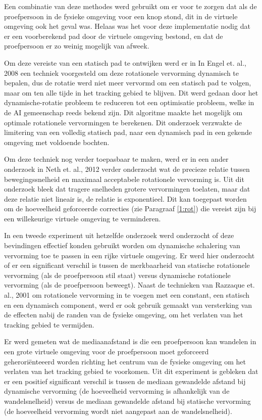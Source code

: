Een combinatie van deze methodes werd gebruikt om er voor te zorgen dat als de
proefpersoon in de fysieke omgeving voor een knop stond, dit in de virtuele
omgeving ook het geval was. Helaas was het voor deze implementatie nodig dat er
een voorberekend pad door de virtuele omgeving bestond, en dat de proefpersoon
er zo weinig mogelijk van afweek.

Om deze vereiste van een statisch pad te ontwijken werd er in In Engel et. al., 
2008 \cite{engel08} een techniek voorgesteld om deze rotationele vervorming 
dynamisch te bepalen, dus de rotatie werd niet meer vervormd om een statisch pad
te volgen, maar om ten alle tijde in het tracking gebied te blijven. Dit werd 
gedaan door het dynamische-rotatie probleem te reduceren tot een optimisatie 
probleem, welke in de AI gemeenschap reeds bekend zijn. Dit algoritme maakte het 
mogelijk om optimale rotationele vervormingen te berekenen. Dit onderzoek 
verzwakte de limitering van een volledig statisch pad, naar een dynamisch pad in 
een gekende omgeving met voldoende bochten.

Om deze techniek nog verder toepasbaar te maken, werd er in een ander onderzoek 
in Neth et. al., 2012 \cite{neth12} verder onderzocht wat de precieze relatie 
tussen bewegingssnelheid en maximaal acceptabele rotationele vervorming is. Uit 
dit onderzoek bleek dat tragere snelheden grotere vervormingen toelaten, maar dat 
deze relatie niet lineair is, de relatie is exponentieel. Dit kan toegepast 
worden om de hoeveelheid geforceerde correcties (zie Paragraaf \ref{1:rot}) die
vereist zijn bij een willekeurige virtuele omgeving te verminderen.

In een tweede experiment uit hetzelfde onderzoek \cite{neth12} werd onderzocht 
of deze bevindingen effectief konden gebruikt worden om dynamische schalering van 
vervorming toe te passen in een rijke virtuele omgeving. Er werd hier onderzocht 
of er een significant verschil is tussen de merkbaarheid van statische 
rotationele vervorming (als de proefpersoon stil staat) versus dynamische 
rotationele vervorming (als de proefpersoon beweegt). Naast de technieken van 
Razzaque et. al., 2001 \cite{kohn01} om rotationele vervorming in te voegen met 
een constant, een statisch en een dynamisch component, werd er ook gebruik 
gemaakt van versterking van de effecten nabij de randen van de fysieke omgeving, 
om het verlaten van het tracking gebied te vermijden. 

Er werd gemeten wat de mediaanafstand is die een proefpersoon kan wandelen in een 
grote virtuele omgeving voor de proefpersoon moet geforceerd geherori\"enteeerd 
worden richting het centrum van de fysieke omgeving om het verlaten van het 
tracking gebied te voorkomen. Uit dit experiment is gebleken dat er een positief 
significant verschil is tussen de mediaan gewandelde afstand bij dynamische 
vervorming (de hoeveelheid vervorming is afhankelijk van de wandelsnelheid) 
versus de mediaan gewandelde afstand bij statische vervorming (de hoeveelheid
vervorming wordt niet aangepast aan de wandelsnelheid).

